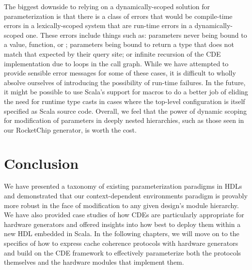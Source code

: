 The biggest downside to relying on a dynamically-scoped solution for parameterization is that there
is a class of errors that would be compile-time errors in a lexically-scoped system that are
run-time errors in a dynamically-scoped one.
These errors include things such as:
parameters never being bound to a value, function, or ;
parameters being bound to return a type that does not match that expected by their query site;
or infinite recursion of the CDE implementation due to loops in the  call graph.
While we have attempted to provide sensible error messages for some of these cases,
it is difficult to wholly absolve ourselves of introducing the possibility of run-time failures.
In the future, it might be possible to use Scala's support for macros to do a better job of eliding the need for runtime type casts
in cases where the top-level configuration is itself specified as Scala source code.
Overall, we feel that the power of dynamic scoping for modification of parameters in deeply nested hierarchies,
such as those seen in our RocketChip generator, is worth the cost.

\section{Conclusion}
\label{sec:con}

We have presented a taxonomy of existing parameterization paradigms in HDLs and demonstrated that our 
context-dependent environments paradigm is provably more robust in the face of modification to any given design's module hierarchy. 
We have also provided case studies of how CDEs are particularly appropriate for hardware generators
and offered insights into how best to deploy them within a new HDL embedded in Scala.
In the following chapters, we will move on to the specifics of how to express cache coherence protocols with hardware generators
and build on the CDE framework to effectively parameterize both the protocols themselves and the hardware modules that implement them.
